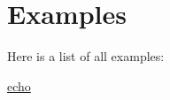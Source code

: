 \section{\-Examples}
\-Here is a list of all examples\-:\begin{DoxyCompactItemize}
\item 
\hyperlink{echo-example}{echo}
\end{DoxyCompactItemize}
